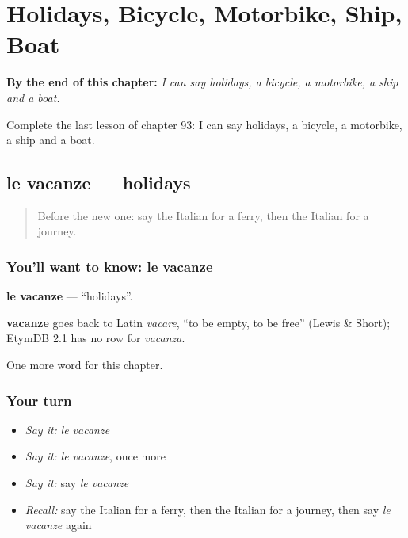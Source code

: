 
\chapter{Holidays, Bicycle, Motorbike, Ship, Boat}
\label{ch:it-holidays-bicycle-motorbike-ship-boat}

\begin{chapteropening}
\textbf{By the end of this chapter:} \emph{I can say holidays, a bicycle, a motorbike, a ship and a boat.}

Complete the last lesson of chapter 93: I can say holidays, a bicycle, a motorbike, a ship and a boat.
\end{chapteropening}

\section[le vacanze]{le vacanze — holidays}

\label{lesson:IT-C93-vacanze}



\begin{quote}
Before the new one: say the Italian for a ferry, then the Italian for a journey.
\end{quote}

\subsection*{You'll want to know: le vacanze}
\textbf{le vacanze} — \textquotedblleft{}holidays\textquotedblright{}.

\begin{cousinweb}
\textbf{vacanze} goes back to Latin \emph{vacare}, \textquotedblleft{}to be empty, to be free\textquotedblright{} (Lewis \& Short); EtymDB 2.1 has no row for \emph{vacanza}.
\end{cousinweb}

\begin{grammarlens}[title={What you've built}]
One more word for this chapter.
\end{grammarlens}

\subsection*{Your turn}
\begin{itemize}
\raggedright
  \item \emph{Say it:} \emph{le vacanze}
  \item \emph{Say it:} \emph{le vacanze}, once more
  \item \emph{Say it:} say \emph{le vacanze}
  \item \emph{Recall:} say the Italian for a ferry, then the Italian for a journey, then say \emph{le vacanze} again
\end{itemize}

